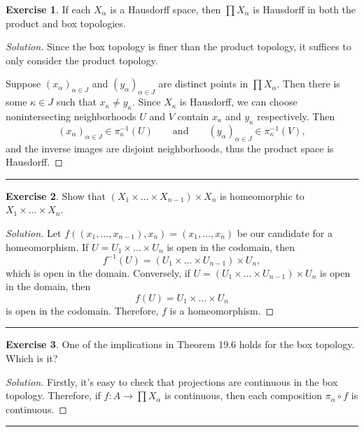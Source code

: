 \documentclass{article}
\theoremstyle{definition}
\newtheorem{exercise}{Exercise}[section]
\begin{document}
\begin{exercise}
  If each $X_\alpha$ is a Hausdorff space, then $\prod X_\alpha$ is Hausdorff in both the product and box topologies.
\end{exercise}
\begin{proof}[Solution]
  Since the box topology is finer than the product topology, it suffices to only consider the product topology.

  Suppose $(x_\alpha)_{\alpha\in J}$ and $(y_\alpha)_{\alpha\in J}$ are distinct points in $\prod X_\alpha$. Then there is some $\kappa\in J$ such that $x_\kappa\ne y_\kappa$. Since $X_\kappa$ is Hausdorff, we can choose nonintersecting neighborhoods $U$ and $V$ contain $x_\kappa$ and $y_\kappa$ respectively. Then
  $$(x_\alpha)_{\alpha\in J}\in \pi_\kappa^{-1}(U)\qquad\text{and}\qquad (y_\alpha)_{\alpha\in J}\in \pi_\kappa^{-1}(V),$$
  and the inverse images are disjoint neighborhoods, thus the product space is Hausdorff.
\end{proof}

\hrule

\begin{exercise}
  Show that $(X_1\times\dots\times X_{n-1})\times X_n$ is homeomorphic to \\ $X_1\times \dots\times X_n$.
\end{exercise}
\begin{proof}[Solution]
  Let $f((x_1,\dots,x_{n-1}),x_n) = (x_1,\dots,x_n)$ be our candidate for a homeomorphism. If $U = U_1\times\dots\times U_n$ is open in the codomain, then
  $$f^{-1}(U) = (U_1\times\dots\times U_{n-1})\times U_n,$$
  which is open in the domain. Conversely, if $U = (U_1\times\dots\times U_{n-1})\times U_n$ is open in the domain, then
  $$f(U) = U_1\times\dots\times U_n$$
  is open in the codomain. Therefore, $f$ is a homeomorphism.
\end{proof}

\hrule

\begin{exercise}
  One of the implications in Theorem 19.6 holds for the box topology. Which is it?
\end{exercise}
\begin{proof}[Solution]
  Firstly, it's easy to check that projections are continuous in the box topology.
  Therefore, if $f:A\to\prod X_\alpha$ is continuous, then each composition $\pi_\alpha \circ f$ is continuous.
\end{proof}

\hrule
\end{document}
